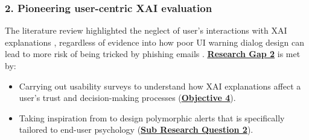 
\subsubsection*{2. Pioneering user-centric XAI evaluation}
The literature review highlighted the neglect of user's interactions with XAI explanations \citep{vo2024securing}, regardless of evidence into how poor UI warning dialog design can lead to more risk of being tricked by phishing emails \citep{greco2023explaining}. \hyperref[research-gap-2]{\uline{\textbf{Research Gap 2}}} is met by:

\begin{itemize}
  \item Carrying out usability surveys to understand how XAI explanations affect a user's trust and decision-making processes (\hyperref[objective-4]{\uline{\textbf{Objective 4}}}).
  \item Taking inspiration from \cite{anderson2015polymorphic} to design polymorphic alerts that is specifically tailored to end-user psychology (\hyperref[sub-research-q2]{\uline{\textbf{Sub Research Question 2}}}).
\end{itemize}

